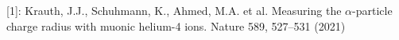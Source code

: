 \documentclass[preview]{standalone}
\begin{document}
\begin{center}
[1]: Krauth, J.J., Schuhmann, K., Ahmed, M.A. et al. Measuring the $\alpha$-particle charge radius with muonic helium-4 ions. Nature 589, 527–531 (2021)
\end{center}
\end{document}
